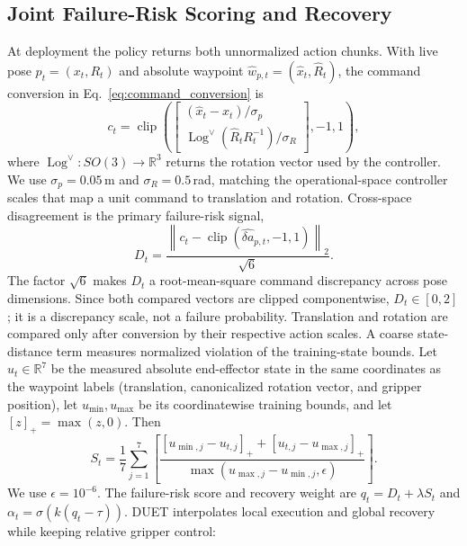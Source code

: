 \documentclass[letterpaper, 10 pt, conference]{ieeeconf}
\begin{document}
\subsection{Joint Failure-Risk Scoring and Recovery}
\label{sec:method-gate}
At deployment the policy returns both unnormalized action chunks. With live pose $p_t=(x_t,R_t)$ and absolute waypoint $\hat{w}_{p,t}=(\hat{x}_t,\hat{R}_t)$, the command conversion in Eq.~\eqref{eq:command_conversion} is
\begin{equation}
    c_t=\operatorname{clip}\!\left(
    \begin{bmatrix}
    (\hat{x}_t-x_t)/\sigma_p \\
    \operatorname{Log}^{\vee}(\hat{R}_tR_t^{-1})/\sigma_R
    \end{bmatrix},-1,1\right),
    \label{eq:recovery_vector}
\end{equation}
where $\operatorname{Log}^{\vee}:SO(3)\rightarrow\mathbb{R}^3$ returns the rotation vector used by the controller. We use $\sigma_p{=}0.05$\,m and $\sigma_R{=}0.5$\,rad, matching the operational-space controller scales that map a unit command to translation and rotation. Cross-space disagreement is the primary failure-risk signal,
\begin{equation}
    D_t=\frac{\left\|c_t-
    \operatorname{clip}(\hat{\delta a}_{p,t},-1,1)\right\|_2}{\sqrt{6}}.
    \label{eq:disagreement}
\end{equation}
The factor $\sqrt{6}$ makes $D_t$ a root-mean-square command discrepancy across pose dimensions. Since both compared vectors are clipped componentwise, $D_t\in[0,2]$; it is a discrepancy scale, not a failure probability. Translation and rotation are compared only after conversion by their respective action scales.
A coarse state-distance term measures normalized violation of the training-state bounds. Let $u_t\in\mathbb{R}^7$ be the measured absolute end-effector state in the same coordinates as the waypoint labels (translation, canonicalized rotation vector, and gripper position), let $u_{\min},u_{\max}$ be its coordinatewise training bounds, and let $[z]_+=\max(z,0)$. Then
\begin{equation}
    S_t =
    \frac{1}{7}\sum_{j=1}^{7}\left[
    \frac{[u_{\min,j}-u_{t,j}]_+ + [u_{t,j}-u_{\max,j}]_+}
    {\max(u_{\max,j}-u_{\min,j},\epsilon)}
    \right].
\end{equation}
We use $\epsilon{=}10^{-6}$. The failure-risk score and recovery weight are $q_t = D_t + \lambda S_t$ and $\alpha_t = \sigma(k(q_t-\tau))$. DUET interpolates local execution and global recovery while keeping relative gripper control:
\end{document}

